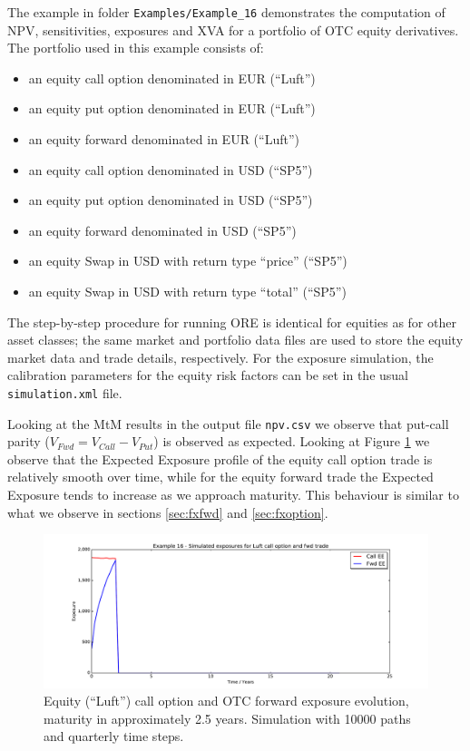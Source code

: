 \documentclass[12pt, a4paper]{article}
\begin{document}
The example in folder {\tt Examples/Example\_16} demonstrates the computation of NPV, sensitivities, exposures and XVA for a portfolio 
of OTC equity derivatives. The portfolio used in this example consists of:

\begin{itemize}
	\item an equity call option denominated in EUR (``Luft'')
	\item an equity put option denominated in EUR (``Luft'')
	\item an equity forward denominated in EUR (``Luft'')
	\item an equity call option denominated in USD (``SP5'')
	\item an equity put option denominated in USD (``SP5'')
	\item an equity forward denominated in USD (``SP5'')
	\item an equity Swap in USD with return type  ``price'' (``SP5'')
	\item an equity Swap in USD with return type ``total'' (``SP5'')
\end{itemize}

The step-by-step procedure for running ORE is identical for equities as for other asset classes; the same market and 
portfolio data files are used to store the equity market data and trade details, respectively. For the exposure 
simulation, the calibration parameters for the equity risk factors can be set in the usual {\tt simulation.xml} file.

Looking at the MtM results in the output file {\tt npv.csv} we observe that put-call parity ($V_{Fwd} = V_{Call} - 
V_{Put}$) is observed as expected. Looking at Figure \ref{fig_eq_call} we observe that the Expected Exposure profile of 
the equity call option trade is relatively smooth over time, while for the equity forward trade the Expected Exposure 
tends to increase as we approach maturity. This behaviour is similar to what we observe in sections \ref{sec:fxfwd} 
and \ref{sec:fxoption}. 

\begin{figure}[h!]
	\begin{center}
		\includegraphics[scale=0.45]{mpl_eq_call.pdf}
	\end{center}
	\caption{Equity (``Luft'') call option and OTC forward exposure evolution, maturity in approximately 2.5 years. 
	Simulation with 
	10000 paths and quarterly time steps.}
	\label{fig_eq_call}
\end{figure}
\end{document}

